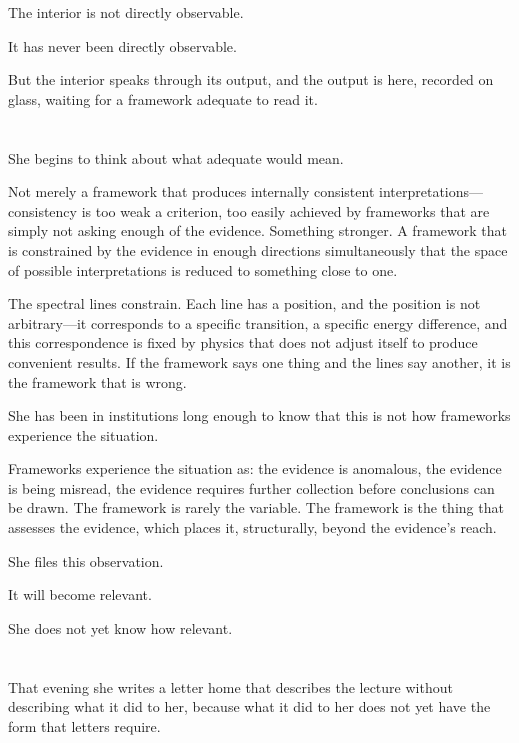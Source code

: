 The interior is not directly observable.

It has never been directly observable.

But the interior speaks through its output, and
the output is here, recorded on glass, waiting
for a framework adequate to read it.

\section{}

She begins to think about what adequate would mean.

Not merely a framework that produces internally
consistent interpretations---consistency is too
weak a criterion, too easily achieved by frameworks
that are simply not asking enough of the evidence.
Something stronger. A framework that is constrained
by the evidence in enough directions simultaneously
that the space of possible interpretations is
reduced to something close to one.

The spectral lines constrain. Each line has a
position, and the position is not arbitrary---it
corresponds to a specific transition, a specific
energy difference, and this correspondence is fixed
by physics that does not adjust itself to produce
convenient results. If the framework says one thing
and the lines say another, it is the framework
that is wrong.

She has been in institutions long enough to know
that this is not how frameworks experience the
situation.

Frameworks experience the situation as: the
evidence is anomalous, the evidence is being
misread, the evidence requires further collection
before conclusions can be drawn. The framework
is rarely the variable. The framework is the
thing that assesses the evidence, which places
it, structurally, beyond the evidence's reach.

She files this observation.

It will become relevant.

She does not yet know how relevant.

\section{}

That evening she writes a letter home that describes
the lecture without describing what it did to her,
because what it did to her does not yet have the
form that letters require.

